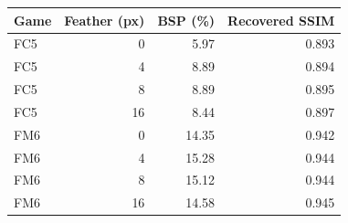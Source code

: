 \begin{tabular}{@{}lrrr@{}}
\toprule
\textbf{Game} & \textbf{Feather (px)} & \textbf{BSP} (\%) & \textbf{Recovered SSIM} \\
\midrule
FC5 & 0 & 5.97 & 0.893 \\
FC5 & 4 & 8.89 & 0.894 \\
FC5 & 8 & 8.89 & 0.895 \\
FC5 & 16 & 8.44 & 0.897 \\
\midrule
FM6 & 0 & 14.35 & 0.942 \\
FM6 & 4 & 15.28 & 0.944 \\
FM6 & 8 & 15.12 & 0.944 \\
FM6 & 16 & 14.58 & 0.945 \\
\bottomrule
\end{tabular}
